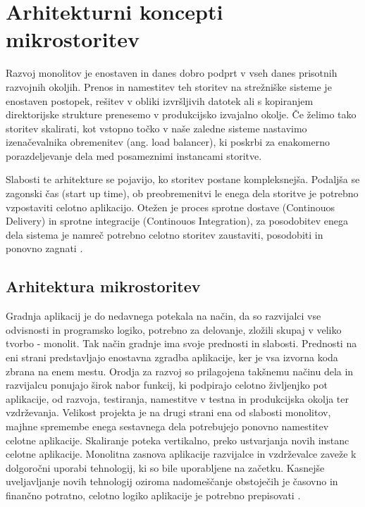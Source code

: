 \documentclass[a4paper, 12pt]{book}
\begin{document}
\chapter{Arhitekturni koncepti mikrostoritev}
\label{ch1}

Razvoj monolitov je enostaven in danes dobro podprt v vseh danes prisotnih razvojnih okoljih.
Prenos in namestitev teh storitev na strežniške sisteme je enostaven postopek, rešitev v obliki izvršljivih datotek ali s kopiranjem direktorijske strukture prenesemo v produkcijsko izvajalno okolje.
Če želimo tako storitev skalirati, kot vstopno točko v naše zaledne sisteme nastavimo izenačevalnika obremenitev (ang. load balancer), ki poskrbi za enakomerno porazdeljevanje dela med posameznimi instancami storitve.

Slabosti te arhitekture se pojavijo, ko storitev postane kompleksnejša.
Podaljša se zagonski čas (start up time), ob preobremenitvi le enega dela storitve je potrebno vzpostaviti celotno aplikacijo.
Otežen je proces sprotne dostave (Continouos Delivery) in sprotne integracije (Continouos Integration), za posodobitev enega dela sistema je namreč potrebno celotno storitev zaustaviti, posodobiti in ponovno zagnati \cite{monolithMicroservice}.


\section{Arhitektura mikrostoritev}

Gradnja aplikacij je do nedavnega potekala na način, da so razvijalci vse odvisnosti in programsko logiko, potrebno za delovanje, zložili skupaj v veliko tvorbo - monolit.
Tak način gradnje ima svoje prednosti in slabosti.
Prednosti na eni strani predstavljajo enostavna zgradba aplikacije, ker je vsa izvorna koda zbrana na enem mestu.
Orodja za razvoj so prilagojena takšnemu načinu dela in razvijalcu ponujajo širok nabor funkcij, ki podpirajo celotno življenjko pot aplikacije, od razvoja, testiranja, namestitve v testna in produkcijska okolja ter vzdrževanja.
Velikost projekta je na drugi strani ena od slabosti monolitov, majhne spremembe enega sestavnega dela potrebujejo ponovno namestitev celotne aplikacije.
Skaliranje poteka vertikalno, preko ustvarjanja novih instanc celotne aplikacije.
Monolitna zasnova aplikacije razvijalce in vzdrževalce zaveže k dolgoročni uporabi tehnologij, ki so bile uporabljene na začetku.
Kasnejše uveljavljanje novih tehnologij oziroma nadomeščanje obstoječih je časovno in finančno potratno, celotno logiko aplikacije je potrebno prepisovati \cite{monolithMicroservice}.
\end{document}
